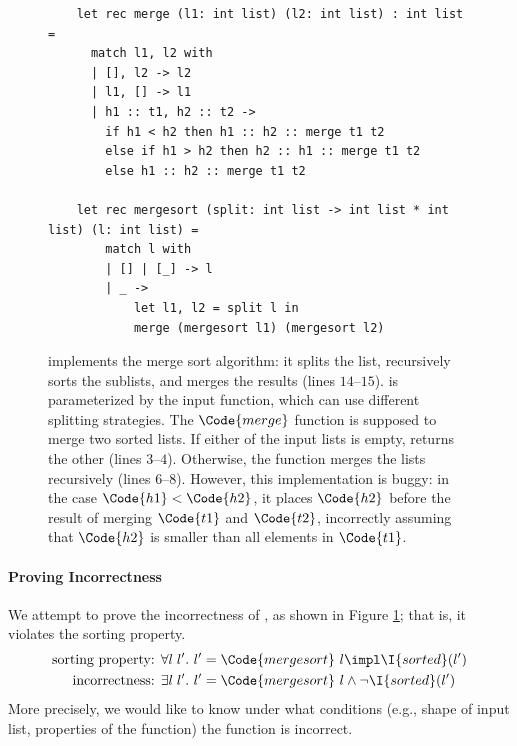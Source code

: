 \begin{figure}[!t]
    \begin{verbatim}
    let rec merge (l1: int list) (l2: int list) : int list =
      match l1, l2 with
      | [], l2 -> l2
      | l1, [] -> l1
      | h1 :: t1, h2 :: t2 ->
        if h1 < h2 then h1 :: h2 :: merge t1 t2
        else if h1 > h2 then h2 :: h1 :: merge t1 t2
        else h1 :: h2 :: merge t1 t2
    
    let rec mergesort (split: int list -> int list * int list) (l: int list) =
        match l with
        | [] | [_] -> l
        | _ ->
            let l1, l2 = split l in
            merge (mergesort l1) (mergesort l2)
    \end{verbatim}
    \caption{ implements the merge sort algorithm: it splits the list, recursively sorts the sublists, and merges the results (lines $14$--$15$).  is parameterized by the input  function, which can use different splitting strategies.
    The $\Code{merge}$ function is supposed to merge two sorted lists. If either of the input lists is empty,  returns the other (lines $3$--$4$). Otherwise, the function merges the lists recursively (lines $6$--$8$). However, this implementation is buggy: in the case $\Code{h1} < \Code{h2}$, it places $\Code{h2}$ before the result of merging $\Code{t1}$ and $\Code{t2}$, incorrectly assuming that $\Code{h2}$ is smaller than all elements in $\Code{t1}$. }
    \label{fig:motivation}
\end{figure}

\paragraph{Proving Incorrectness} We attempt to prove the incorrectness of , as shown in Figure \ref{fig:motivation}; that is, it violates the sorting property.
\begin{align*}
    \text{sorting property: } & \forall l\;l'.\ l' = \Code{mergesort}\ l \impl \I{sorted}(l')
    \\ \text{incorrectness: } & \exists l\;l'.\ l' = \Code{mergesort}\ l \land \neg \I{sorted}(l')
\end{align*}\noindent
More precisely, we would like to know under what conditions (e.g., shape of input list, properties of the  function) the  function is incorrect.

